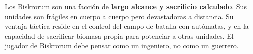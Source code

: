\begin{tcolorbox}[colback=VoidPurple!10, colframe=VoidPurple, title=\textbf{FILOSOFÍA DE JUEGO — BISKRORUM}]
\small Los Biskrorum son una facción de \textbf{largo alcance y sacrificio calculado}. Sus unidades son frágiles en cuerpo a cuerpo pero devastadoras a distancia. Su ventaja táctica reside en el control del campo de batalla con autómatas, y en la capacidad de sacrificar biomasa propia para potenciar a otras unidades. El jugador de Biskrorum debe pensar como un ingeniero, no como un guerrero.
\end{tcolorbox}